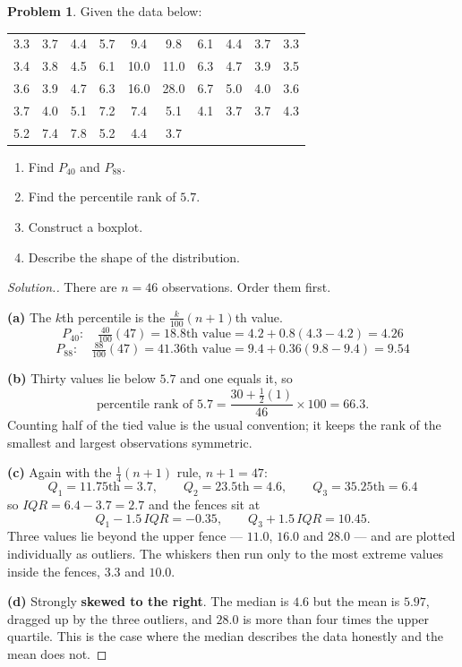 \documentclass[11pt,a4paper]{article}
\theoremstyle{definition}
\newtheorem{problemx}{Problem}[section]
\newenvironment{problem}{\begin{problemx}}{\end{problemx}}
\newenvironment{solution}
  {\renewcommand{\qedsymbol}{}\begin{proof}[\textit{Solution}.]}
  {\end{proof}}
\begin{document}
\begin{problem}
Given the data below:
\begin{table}[H]
\centering
\begin{tabular}{cccccccccc}
3.3 & 3.7 & 4.4 & 5.7 & 9.4 & 9.8 & 6.1 & 4.4 & 3.7 & 3.3\\
3.4 & 3.8 & 4.5 & 6.1 & 10.0 & 11.0 & 6.3 & 4.7 & 3.9 & 3.5\\
3.6 & 3.9 & 4.7 & 6.3 & 16.0 & 28.0 & 6.7 & 5.0 & 4.0 & 3.6\\
3.7 & 4.0 & 5.1 & 7.2 & 7.4 & 5.1 & 4.1 & 3.7 & 3.7 & 4.3\\
5.2 & 7.4 & 7.8 & 5.2 & 4.4 & 3.7 & & & &\\
\end{tabular}
\end{table}
\begin{enumerate}
\item[(a).] Find $P_{40}$ and $P_{88}$.
\item[(b).] Find the percentile rank of $5.7$.
\item[(c).] Construct a boxplot.
\item[(d).] Describe the shape of the distribution.
\end{enumerate}
\end{problem}

\begin{solution}
There are $n=46$ observations. Order them first.

\textbf{(a)} The $k$th percentile is the $\tfrac{k}{100}(n+1)$th value.
\[P_{40}:\quad \tfrac{40}{100}(47)=18.8\text{th value}=4.2+0.8(4.3-4.2)=4.26\]
\[P_{88}:\quad \tfrac{88}{100}(47)=41.36\text{th value}=9.4+0.36(9.8-9.4)=9.54\]

\textbf{(b)} Thirty values lie below $5.7$ and one equals it, so
\[\text{percentile rank of }5.7=\frac{30+\tfrac{1}{2}(1)}{46}\times 100=66.3.\]
Counting half of the tied value is the usual convention; it keeps the rank of the smallest
and largest observations symmetric.

\textbf{(c)} Again with the $\tfrac{1}{4}(n+1)$ rule, $n+1=47$:
\[Q_1=11.75\text{th}=3.7,\qquad Q_2=23.5\text{th}=4.6,\qquad Q_3=35.25\text{th}=6.4\]
so $IQR=6.4-3.7=2.7$ and the fences sit at
\[Q_1-1.5\,IQR=-0.35,\qquad Q_3+1.5\,IQR=10.45.\]
Three values lie beyond the upper fence --- $11.0$, $16.0$ and $28.0$ --- and are plotted
individually as outliers. The whiskers then run only to the most extreme values inside the
fences, $3.3$ and $10.0$.

\textbf{(d)} Strongly \textbf{skewed to the right}. The median is $4.6$ but the mean is
$5.97$, dragged up by the three outliers, and $28.0$ is more than four times the upper
quartile. This is the case where the median describes the data honestly and the mean does
not.
\end{solution}
\end{document}
